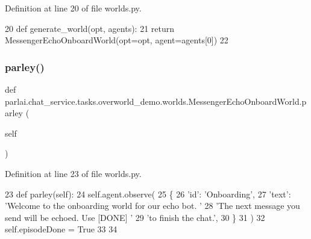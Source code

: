 Definition at line 20 of file worlds.\+py.


\begin{DoxyCode}
20     \textcolor{keyword}{def }generate\_world(opt, agents):
21         \textcolor{keywordflow}{return} MessengerEchoOnboardWorld(opt=opt, agent=agents[0])
22 
\end{DoxyCode}
\mbox{\label{classparlai_1_1chat__service_1_1tasks_1_1overworld__demo_1_1worlds_1_1MessengerEchoOnboardWorld_aaf4f7b875e6a7be02164f4f63463e6b0}} 
\subsubsection{\texorpdfstring{parley()}{parley()}}
{\footnotesize\ttfamily def parlai.\+chat\+\_\+service.\+tasks.\+overworld\+\_\+demo.\+worlds.\+Messenger\+Echo\+Onboard\+World.\+parley (\begin{DoxyParamCaption}\item[{}]{self }\end{DoxyParamCaption})}



Definition at line 23 of file worlds.\+py.


\begin{DoxyCode}
23     \textcolor{keyword}{def }parley(self):
24         self.agent.observe(
25             \{
26                 \textcolor{stringliteral}{'id'}: \textcolor{stringliteral}{'Onboarding'},
27                 \textcolor{stringliteral}{'text'}: \textcolor{stringliteral}{'Welcome to the onboarding world for our echo bot. '}
28                 \textcolor{stringliteral}{'The next message you send will be echoed. Use [DONE] '}
29                 \textcolor{stringliteral}{'to finish the chat.'},
30             \}
31         )
32         self.episodeDone = \textcolor{keyword}{True}
33 
34 
\end{DoxyCode}


